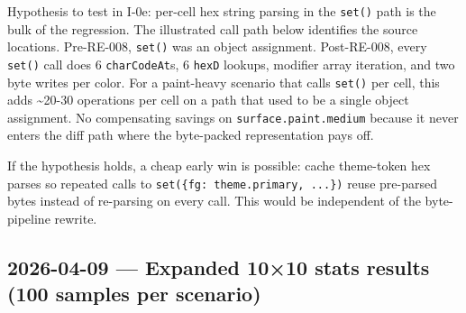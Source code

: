 \begin{enumerate}
  Hypothesis to test in I-0e: per-cell hex string parsing in the \texttt{s\allowbreak{}e\allowbreak{}t\allowbreak{}(\allowbreak{})} path is the bulk of the regression. The illustrated call path below identifies the source locations. Pre-RE-008, \texttt{s\allowbreak{}e\allowbreak{}t\allowbreak{}(\allowbreak{})} was an object assignment. Post-RE-008, every \texttt{s\allowbreak{}e\allowbreak{}t\allowbreak{}(\allowbreak{})} call does 6 \texttt{c\allowbreak{}h\allowbreak{}a\allowbreak{}r\allowbreak{}C\allowbreak{}o\allowbreak{}d\allowbreak{}e\allowbreak{}A\allowbreak{}t}s, 6 \texttt{h\allowbreak{}e\allowbreak{}x\allowbreak{}D} lookups, modifier array iteration, and two byte writes per color. For a paint-heavy scenario that calls \texttt{s\allowbreak{}e\allowbreak{}t\allowbreak{}(\allowbreak{})} per cell, this adds \textasciitilde20-30 operations per cell on a path that used to be a single object assignment. No compensating savings on \texttt{s\allowbreak{}u\allowbreak{}r\allowbreak{}f\allowbreak{}a\allowbreak{}c\allowbreak{}e\allowbreak{}.\allowbreak{}p\allowbreak{}a\allowbreak{}i\allowbreak{}n\allowbreak{}t\allowbreak{}.\allowbreak{}m\allowbreak{}e\allowbreak{}d\allowbreak{}i\allowbreak{}u\allowbreak{}m} because it never enters the diff path where the byte-packed representation pays off.
\end{enumerate}



If the hypothesis holds, a cheap early win is possible: cache theme-token hex parses so repeated calls to \texttt{s\allowbreak{}e\allowbreak{}t\allowbreak{}(\allowbreak{}\{\allowbreak{}f\allowbreak{}g\allowbreak{}:\allowbreak{} \allowbreak{}t\allowbreak{}h\allowbreak{}e\allowbreak{}m\allowbreak{}e\allowbreak{}.\allowbreak{}p\allowbreak{}r\allowbreak{}i\allowbreak{}m\allowbreak{}a\allowbreak{}r\allowbreak{}y\allowbreak{},\allowbreak{} \allowbreak{}.\allowbreak{}.\allowbreak{}.\allowbreak{}\}\allowbreak{})} reuse pre-parsed bytes instead of re-parsing on every call. This would be independent of the byte-pipeline rewrite.

\subsection{2026-04-09 --- Expanded 10×10 stats results (100 samples per scenario)}\label{record-422-expanded-1010-stats-results-100-samples-per-scenario}

